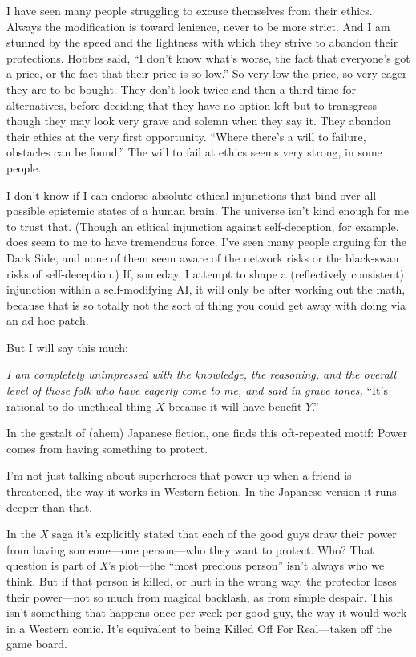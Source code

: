 {
 I have seen many people struggling to excuse themselves from their
ethics. Always the modification is toward lenience, never to be more
strict. And I am stunned by the speed and the lightness with which they
strive to abandon their protections. Hobbes said, ``I
don't know what's worse, the fact that
everyone's got a price, or the fact that their price is
so low.'' So very low the price, so very eager they
are to be bought. They don't look twice and then a
third time for alternatives, before deciding that they have no option
left but to transgress---though they may look very grave and solemn
when they say it. They abandon their ethics at the very first
opportunity. ``Where there's a will to
failure, obstacles can be found.'' The will to fail
at ethics seems very strong, in some people.}

{
 I don't know if I can endorse absolute ethical
injunctions that bind over all possible epistemic states of a human
brain. The universe isn't kind enough for me to trust
that. (Though an ethical injunction against self-deception, for
example, does seem to me to have tremendous force. I've
seen many people arguing for the Dark Side, and none of them seem aware
of the network risks or the black-swan risks of self-deception.) If,
someday, I attempt to shape a (reflectively consistent) injunction
within a self-modifying AI, it will only be after working out the math,
because that is so totally not the sort of thing you could get away
with doing via an ad-hoc patch.}

{
 But I will say this much:}

{
 \textit{I am completely unimpressed with the knowledge, the
reasoning, and the overall level of those folk who have eagerly come to
me, and said in grave tones,} ``It's
rational to do unethical thing $X$ because it will have benefit
$Y$.''}

\myendsectiontext



{
 In the gestalt of (ahem) Japanese fiction, one finds this
oft-repeated motif: Power comes from having something to protect. }

{
 I'm not just talking about superheroes that power
up when a friend is threatened, the way it works in Western fiction. In
the Japanese version it runs deeper than that.}

{
 In the \textit{X} saga it's explicitly stated that
each of the good guys draw their power from having someone---one
person---who they want to protect. Who? That question is part of
\textit{X}'s plot---the ``most
precious person'' isn't always who we
think. But if that person is killed, or hurt in the wrong way, the
protector loses their power---not so much from magical backlash, as
from simple despair. This isn't something that happens
once per week per good guy, the way it would work in a Western comic.
It's equivalent to being Killed Off For Real{}---taken
off the game board.}

